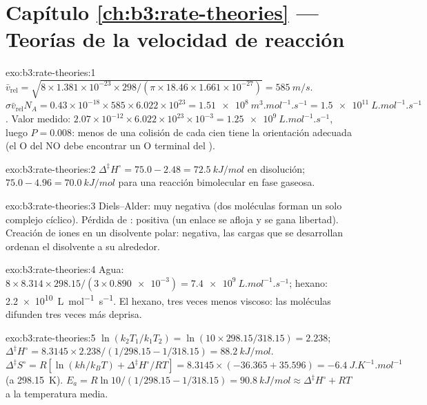 \section*{Capítulo \ref{ch:b3:rate-theories} --- Teorías de la velocidad de reacción}

\begin{solution}{exo:b3:rate-theories:1}
$\bar v_{\mathrm{rel}} = \sqrt{8 \times 1.381\times10^{-23} \times 298/(\pi \times 18.46 \times 1.661\times10^{-27})} = \qty{585}{m/s}$.
$\sigma\bar v_{\mathrm{rel}}N_A = 0.43\times10^{-18} \times 585 \times 6.022\times10^{23} = \qty{1.51e8}{m^3.mol^{-1}.s^{-1}} =
\qty{1.5e11}{L.mol^{-1}.s^{-1}}$. Valor medido: $2.07\times10^{-12} \times 6.022\times10^{23}\times10^{-3} =
\qty{1.25e9}{L.mol^{-1}.s^{-1}}$, luego $P = 0.008$: menos de una colisión de cada cien tiene la
orientación adecuada (el O del NO debe encontrar un O terminal del ).
\end{solution}

\begin{solution}{exo:b3:rate-theories:2}
$\Delta^{\ddagger}H^\circ = 75.0 - 2.48 = \qty{72.5}{kJ/mol}$ en disolución; $75.0 - 4.96 = \qty{70.0}{kJ/mol}$
para una reacción bimolecular en fase gaseosa.
\end{solution}

\begin{solution}{exo:b3:rate-theories:3}
Diels--Alder: muy negativa (dos moléculas forman un solo complejo cíclico).
Pérdida de : positiva (un enlace se afloja y se gana libertad). Creación de iones en un
disolvente polar: negativa, las cargas que se desarrollan ordenan el disolvente a su alrededor.
\end{solution}

\begin{solution}{exo:b3:rate-theories:4}
Agua: $8 \times 8.314 \times 298.15/(3 \times \num{0.890e-3}) = \qty{7.4e9}{L.mol^{-1}.s^{-1}}$; hexano:
\qty{2.2e10}{L.mol^{-1}.s^{-1}}. El hexano, tres veces menos viscoso: las moléculas difunden tres
veces más deprisa.
\end{solution}

\begin{solution}{exo:b3:rate-theories:5}
$\ln(k_2T_1/k_1T_2) = \ln(10 \times 298.15/318.15) = 2.238$; $\Delta^{\ddagger}H^\circ = 8.3145 \times 2.238/(1/298.15 -
1/318.15) = \qty{88.2}{kJ/mol}$. $\Delta^{\ddagger}S^\circ = R[\ln(kh/k_BT) + \Delta^{\ddagger}H^\circ/RT] = 8.3145 \times
(-36.365 + 35.596) = \qty{-6.4}{J.K^{-1}.mol^{-1}}$ (a \qty{298.15}{K}). $E_a = R\ln10/(1/298.15 - 1/318.15) =
\qty{90.8}{kJ/mol} \approx \Delta^{\ddagger}H^\circ + RT$ a la temperatura media.
\end{solution}

